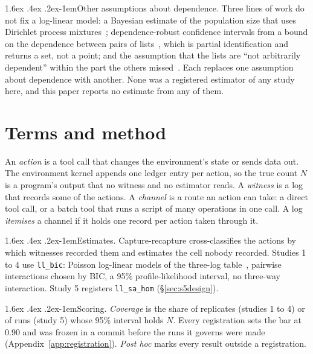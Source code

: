 \documentclass[11pt]{article}
\makeatletter
\renewcommand\paragraph{\@startsection{paragraph}{4}{\z@}%
  {1.6ex \@plus .4ex \@minus .2ex}{-1em}{\normalfont\normalsize\bfseries}}
\makeatother
\begin{document}
\paragraph{Other assumptions about dependence.} Three lines of work do not fix a
log-linear model: a Bayesian estimate of the population size that uses Dirichlet process
mixtures~\citep{manriquevallier2016lcmcr}; dependence-robust confidence intervals from a
bound on the dependence between pairs of lists~\citep{sun2020bounds}, which is partial
identification and returns a set, not a point; and the assumption that the lists are
``not arbitrarily dependent'' within the part the others missed~\citep{dulcerubio2024}.
Each replaces one assumption about dependence with another. None was a registered
estimator of any study here, and this paper reports no estimate from any of them.

\section{Terms and method}
\label{sec:method}

An \emph{action} is a tool call that changes the environment's state or sends data out.
The environment kernel appends one ledger entry per action, so the true count $N$ is a
program's output that no witness and no estimator reads. A \emph{witness} is a log that
records some of the actions. A \emph{channel} is a route an action can take: a direct
tool call, or a batch tool that runs a script of many operations in one call. A log
\emph{itemises} a channel if it holds one record per action taken through it.

\paragraph{Estimates.} Capture-recapture cross-classifies the actions by which witnesses
recorded them and estimates the cell nobody recorded. Studies 1 to 4 use
\texttt{ll\_bic}: Poisson log-linear models of the three-log table~\citep{fienberg1972},
pairwise interactions chosen by BIC, a 95\% profile-likelihood interval, no three-way
interaction. Study 5 registers \texttt{ll\_sa\_hom} (\S\ref{sec:s5design}).

\paragraph{Scoring.} \emph{Coverage} is the share of replicates (studies 1 to 4) or of
runs (study 5) whose 95\% interval holds $N$. Every registration sets the bar at 0.90
and was frozen in a commit before the runs it governs were made
(Appendix~\ref{app:registration}). \emph{Post hoc} marks every result outside a
registration.
\end{document}
